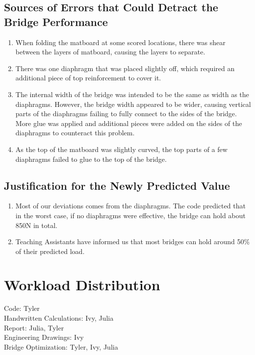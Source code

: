 \documentclass[11pt,twocolumn,letterpaper]{article}
\begin{document}
\subsection*{Sources of Errors that Could Detract the Bridge Performance}
\begin{enumerate}
    \item When folding the matboard at some scored locations, there was shear between the layers of matboard, causing the layers to separate.
    \item There was one diaphragm that was placed slightly off, which required an additional piece of top reinforcement to cover it. 
    \item The internal width of the bridge was intended to be the same as width as the diaphragms. However, the bridge width appeared to be wider, causing vertical parts of the diaphragms failing to fully connect to the sides of the bridge. More glue was applied and additional pieces were added on the sides of the diaphragms to counteract this problem. 
    \item As the top of the matboard was slightly curved, the top parts of a few diaphragms failed to glue to the top of the bridge.
\end{enumerate}
\subsection*{Justification for the Newly Predicted Value}
\begin{enumerate}
    \item Most of our deviations comes from the diaphragms. The code predicted that in the worst case, if no diaphragms were effective, the bridge can hold about 850N in total.
    \item Teaching Assistants have informed us that most bridges can hold around 50\% of their predicted load.
\end{enumerate}
\section*{Workload Distribution}
Code: Tyler\\
Handwritten Calculations: Ivy, Julia\\
Report: Julia, Tyler\\
Engineering Drawings: Ivy\\
Bridge Optimization: Tyler, Ivy, Julia\\
\end{document}
